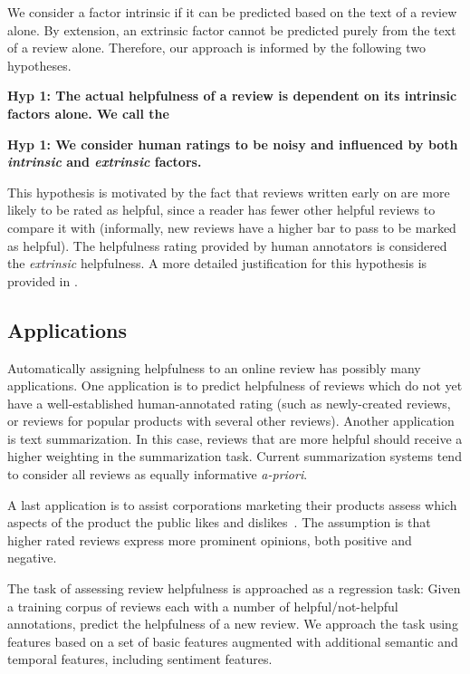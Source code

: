 \documentclass[letter,12pt]{article}
\begin{document}
We consider a factor intrinsic if it can be predicted based on the text of a review alone. By extension, an extrinsic factor cannot be predicted purely from the text of a review alone. Therefore, our approach is informed by the following two hypotheses. 

\bf{Hyp 1:}  The actual helpfulness of a review is dependent on its intrinsic factors alone. 
We call the 

\bf{Hyp 1:} We consider human ratings to be noisy and influenced by both {\em intrinsic} and {\em extrinsic} factors.

This hypothesis is motivated by the fact that reviews written early on are more likely to be rated as helpful, since a reader has fewer other helpful reviews to compare it with (informally, new reviews have a higher bar to pass to be marked as helpful).
The helpfulness rating provided by human annotators is considered the {\em extrinsic} helpfulness.
A more detailed justification for this hypothesis  is provided in .

\subsection{Applications}
Automatically assigning helpfulness to an online review has possibly many applications. One application is to predict helpfulness of reviews which do not yet have a well-established human-annotated rating (such as newly-created reviews, or reviews for popular products with several other reviews).  Another application is text summarization. In this case, reviews that are more helpful should receive a higher weighting in the summarization task. Current summarization systems tend to consider all reviews as  equally informative {\em a-priori}.

A last application is to assist corporations marketing their products assess which aspects of the 
	product the public likes and dislikes~\cite{2007ghose-helpfulness}. The assumption is that higher rated reviews express more prominent opinions, both positive and negative.



The task of assessing review helpfulness is approached as a regression task:
Given a training corpus of reviews each with a number of helpful/not-helpful
	annotations, predict the helpfulness of a new review.
We approach the task using features based on a set of basic features augmented
	with additional semantic and temporal features, including sentiment
	features.
\end{document}
